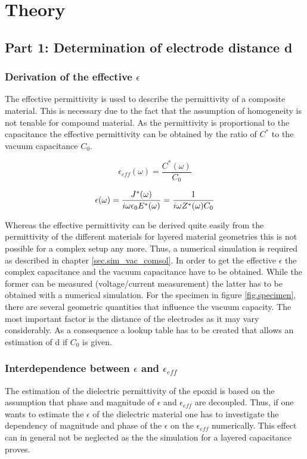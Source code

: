 \chapter{Theory}
\section{Part 1: Determination of electrode distance d}
\subsection{Derivation of the effective $\epsilon$}
The effective permittivity is used to describe the permittivity of a composite material. This is necessary due to the fact that the assumption of homogeneity is not tenable for compound material. As the permittivity is proportional to the capacitance the effective permittivity can be obtained by the ratio of $C^*$ to the vacuum capacitance $C_0$.

\begin{equation}
\epsilon_{eff}(\omega)= \frac{C^*(\omega)}{C_0} 
\end{equation}

\begin{equation}
\epsilon(\omega)=\frac{J^*(\omega)}{i \omega \epsilon_0 E^*(\omega)} = \frac{1}{i \omega Z^*(\omega) C_0}\\
\end{equation}

Whereas the effective permittivity can be derived quite easily from the permittivity of the different materials for layered material geometries this is not possible for a complex setup any more. Thus, a numerical simulation is required as described in chapter \ref{sec.sim_vac_comsol}. In order to get the effective $\epsilon$ the complex capacitance and the vacuum capacitance have to be obtained. While the former can be measured (voltage/current measurement) the latter has to be obtained with a numerical simulation. 
For the specimen in figure \ref{fig.specimen}, there are several geometric quantities that influence the vacuum capacity. The most important factor is the distance of the electrodes as it may vary considerably. As a consequence a lookup table has to be created that allows an estimation of d if $C_0$ is given.

 


\subsection{Interdependence between $\epsilon$ and $\epsilon_{eff}$} 
The estimation of the dielectric permittivity of the epoxid is based on the assumption that phase and magnitude of $\epsilon$ and $\epsilon_{eff}$ are decoupled. Thus, if one wants to estimate the $\epsilon$ of the dielectric material one has to investigate the dependency of magnitude and phase of the $\epsilon$ on the $\epsilon_{eff}$ numerically. This effect can in general not be neglected as the the simulation for a layered capacitance proves.  

